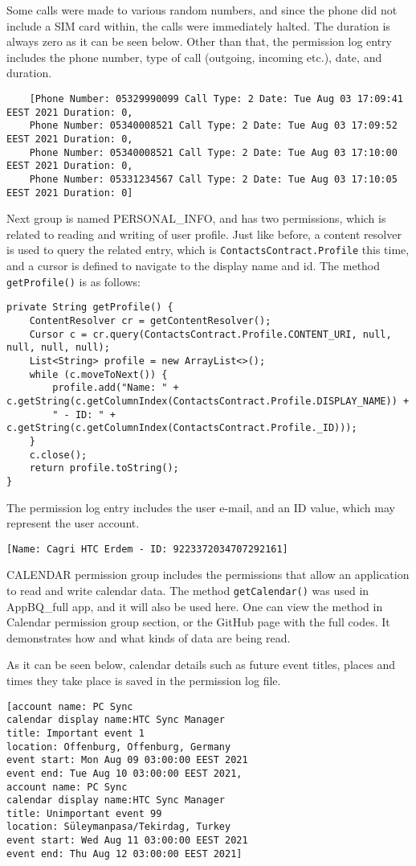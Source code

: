 \documentclass[
  a4paper,  %
  twoside,  %
  bibliography=totoc,
  headsepline,
  cleardoublepage=empty,
  parskip=half,
  draft=false,
  open=any
]{scrbook}
\begin{document}
Some calls were made to various random numbers, and since the phone did not include a SIM card within, the calls were immediately halted. The duration is always zero as it can be seen below. Other than that, the permission log entry includes the phone number, type of call (outgoing, incoming etc.), date, and duration.
\begin{lstlisting}
	[Phone Number: 05329990099 Call Type: 2 Date: Tue Aug 03 17:09:41 EEST 2021 Duration: 0, 
	Phone Number: 05340008521 Call Type: 2 Date: Tue Aug 03 17:09:52 EEST 2021 Duration: 0, 
	Phone Number: 05340008521 Call Type: 2 Date: Tue Aug 03 17:10:00 EEST 2021 Duration: 0, 
	Phone Number: 05331234567 Call Type: 2 Date: Tue Aug 03 17:10:05 EEST 2021 Duration: 0]
\end{lstlisting}

Next group is named PERSONAL\_INFO, and has two permissions, which is related to reading and writing of user profile. Just like before, a content resolver is used to query the related entry, which is \texttt{ContactsContract.Profile} this time, and a cursor is defined to navigate to the display name and id. The method \texttt{getProfile()} is as follows:
\begin{lstlisting}
private String getProfile() {
	ContentResolver cr = getContentResolver();
	Cursor c = cr.query(ContactsContract.Profile.CONTENT_URI, null, null, null, null);
	List<String> profile = new ArrayList<>();
	while (c.moveToNext()) {
		profile.add("Name: " + c.getString(c.getColumnIndex(ContactsContract.Profile.DISPLAY_NAME)) +
		" - ID: " + c.getString(c.getColumnIndex(ContactsContract.Profile._ID)));
	}
	c.close();
	return profile.toString();
}
\end{lstlisting}
The permission log entry includes the user e-mail, and an ID value, which may represent the user account.
\begin{lstlisting}
[Name: Cagri HTC Erdem - ID: 9223372034707292161]
\end{lstlisting}

CALENDAR permission group includes the permissions that allow an application to read and write calendar data. The method \texttt{getCalendar()} was used in AppBQ\_full app, and it will also be used here. One can view the method in Calendar permission group section, or the GitHub page with the full codes. It demonstrates how and what kinds of data are being read.

As it can be seen below, calendar details such as future event titles, places and times they take place is saved in the permission log file.
\begin{lstlisting}
[account name: PC Sync
calendar display name:HTC Sync Manager
title: Important event 1
location: Offenburg, Offenburg, Germany
event start: Mon Aug 09 03:00:00 EEST 2021
event end: Tue Aug 10 03:00:00 EEST 2021, 
account name: PC Sync
calendar display name:HTC Sync Manager
title: Unimportant event 99
location: Süleymanpasa/Tekirdag, Turkey
event start: Wed Aug 11 03:00:00 EEST 2021
event end: Thu Aug 12 03:00:00 EEST 2021]
\end{lstlisting}
\end{document}
